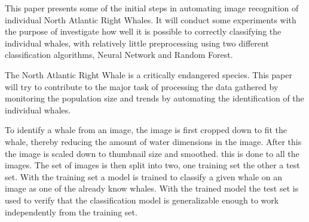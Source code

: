 This paper presents some of the initial steps in automating image recognition of individual North Atlantic Right Whales.
It will conduct some experiments with the purpose of investigate how well it is possible to correctly classifying the individual whales, with relatively little preprocessing using two different classification algorithms, Neural Network and Random Forest.

The North Atlantic Right Whale is a critically endangered species. 
This paper will try to contribute to the major task of processing the data gathered by monitoring the population size and trends by automating the identification of the individual whales.

To identify a whale from an image, the image is first cropped down to fit the whale, thereby reducing the amount of water dimensions in the image. After this the image is scaled down to thumbnail size and smoothed. this is done to all the images. The set of images is then split into two, one training set the other a test set.
With the training set a model is trained to classify a given whale on an image as one of the already know whales.
With the trained model the test set is used to verify that the classification model is generalizable enough to work independently from the training set.